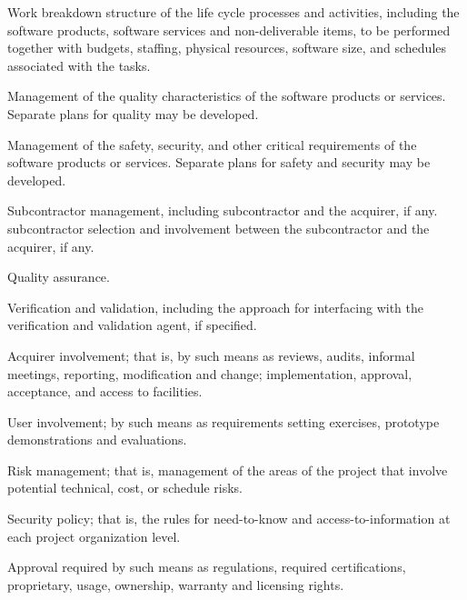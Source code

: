 \begin{adjustwidth}{2em}{0pt}
\begin{compactenum}
\begin{compactenum}
\begin{compactenum}
							\item Work breakdown structure of the life cycle processes and activities, including the software products, software services and non-deliverable items, to be performed together with budgets, staffing, physical resources, software size, and schedules associated with the tasks.

							\item Management of the quality characteristics of the software products or services. Separate plans for quality may be developed.

							\item Management of the safety, security, and other critical requirements of the software products or services. Separate plans for safety and security may be developed.

							\item Subcontractor management, including subcontractor and the acquirer, if any. subcontractor selection and involvement between the subcontractor and the acquirer, if any. 

							\item Quality assurance.

							\item Verification and validation, including the approach for interfacing with the verification and validation agent, if specified. 

							\item Acquirer involvement; that is, by such means as reviews, audits, informal meetings, reporting, modification and change; implementation, approval, acceptance, and access to facilities.
							
							\item User involvement; by such means as requirements setting exercises, prototype demonstrations and evaluations.
							
							\item Risk management; that is, management of the areas of the project that involve potential technical, cost, or schedule risks.
							
							\item Security policy; that is, the rules for need-to-know and access-to-information at each project organization level.
							
							\item Approval required by such means as regulations, required certifications, proprietary, usage, ownership, warranty and licensing rights.
							

\end{compactenum}
\end{compactenum}
\end{compactenum}
\end{adjustwidth}
